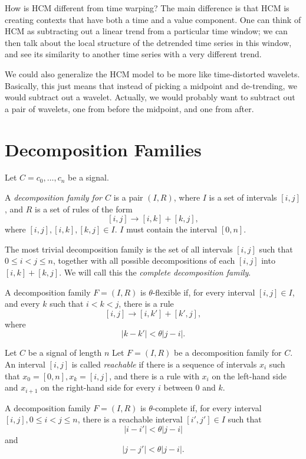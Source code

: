 \documentclass{article}
\begin{document}
How is HCM different from time warping? The main difference is that
HCM is creating contexts that have both a time and a value
component. One can think of HCM as subtracting out a linear trend from
a particular time window; we can then talk about the local structure
of the detrended time series in this window, and see its similarity to
another time series with a very different trend.

We could also generalize the HCM model to be more like time-distorted
wavelets. Basically, this just means that instead of picking a
midpoint and de-trending, we would subtract out a wavelet. Actually,
we would probably want to subtract out a pair of wavelets, one from
before the midpoint, and one from after.

\section{Decomposition Families}

\begin{defn}
Let $C=c_0,\dots,c_n$ be a signal.

A {\em decomposition family for $C$} is a pair $(I, R)$, where $I$ is
a set of intervals $[i,j]$, and $R$ is a set of rules of the form
$$[i,j] \to [i,k] + [k,j],$$ where $[i,j], [i,k], [k,j]\in I$. $I$
  must contain the interval $[0,n]$.
\end{defn}

The most trivial decomposition family is the set of all intervals
$[i,j]$ such that $0\le i < j \le n$, together with all possible
decompositions of each $[i,j]$ into $[i,k] + [k,j]$. We will call this
the {\em complete decomposition family}.


\begin{defn}
A decomposition family $F=(I,R)$ is $\theta$-flexible if, for every interval
$[i,j]\in I$, and every $k$ such that $i<k<j$, there is a rule
$$[i,j] \to [i,k'] + [k',j],$$
where 
$$|k-k'| < \theta |j-i|.$$
\end{defn}

\begin{defn}
Let $C$ be a signal of length $n$ Let $F=(I,R)$ be a decomposition
family for $C$.  An interval $[i,j]$ is called {\em reachable} if
there is a sequence of intervals $x_i$ such that $x_0=[0,n],
x_k=[i,j]$, and there is a rule with $x_i$ on the left-hand side and
$x_{i+1}$ on the right-hand side for every $i$ between $0$ and $k$.
\end{defn}

\begin{defn}
A decomposition family $F=(I,R)$ is $\theta$-complete if, for every
interval $[i,j], 0\le i< j \le n$, there is a reachable interval
$[i',j']\in I$ such that
$$|i-i'| < \theta |j-i|$$
and
$$|j-j'| < \theta |j-i|.$$
\end{defn}
\end{document}

